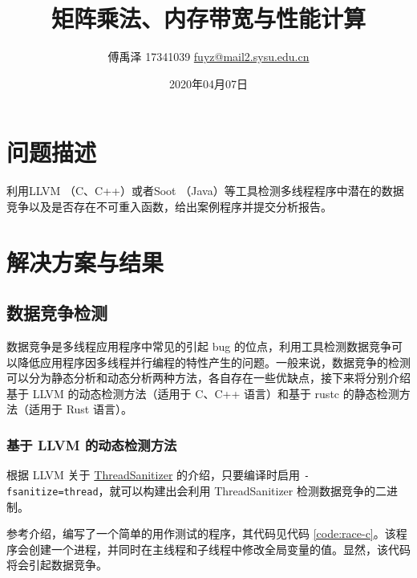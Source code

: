 \documentclass[a4paper, 12pt]{article} %
\title{\textbf{矩阵乘法、内存带宽与性能计算}\\ %
} %
\author{
傅禹泽 17341039 \href{mailto:fuyz@mail2.sysu.edu.cn}{fuyz@mail2.sysu.edu.cn}} %
\date{2020年04月07日} %
\makeatletter
\newcounter{code}
\numberwithin{equation}{section}
\renewcommand{\maketitle}{ %
\begin{center} %
{\LARGE\@title} %

\large{\@subtitle}

\vspace{1em} %

{\large\@author} %

\vspace{1.5em} %
\end{center}
}
\newcommand\@subtitle{Homework 2}
\makeatother
\begin{document}
\thispagestyle{empty}


\renewcommand{\abstractname}{摘要} %


\section{问题描述}

利用LLVM （C、C++）或者Soot （Java）等工具检测多线程程序中潜在的数据竞争以及是否存在不可重入函数，给出案例程序并提交分析报告。

\section{解决方案与结果}

\subsection{数据竞争检测}

数据竞争是多线程应用程序中常见的引起 bug 的位点，利用工具检测数据竞争可以降低应用程序因多线程并行编程的特性产生的问题。一般来说，数据竞争的检测可以分为静态分析和动态分析两种方法，各自存在一些优缺点，接下来将分别介绍基于 LLVM 的动态检测方法（适用于 C、C++ 语言）和基于 rustc 的静态检测方法（适用于 Rust 语言）。

\subsubsection{基于 LLVM 的动态检测方法}

根据 LLVM 关于 \href{https://clang.llvm.org/docs/ThreadSanitizer.html}{ThreadSanitizer} 的介绍，只要编译时启用 \texttt{-fsanitize=thread}，就可以构建出会利用 ThreadSanitizer 检测数据竞争的二进制。

参考介绍，编写了一个简单的用作测试的程序，其代码见代码 \ref{code:race-c}。该程序会创建一个进程，并同时在主线程和子线程中修改全局变量的值。显然，该代码将会引起数据竞争。
\end{document}
